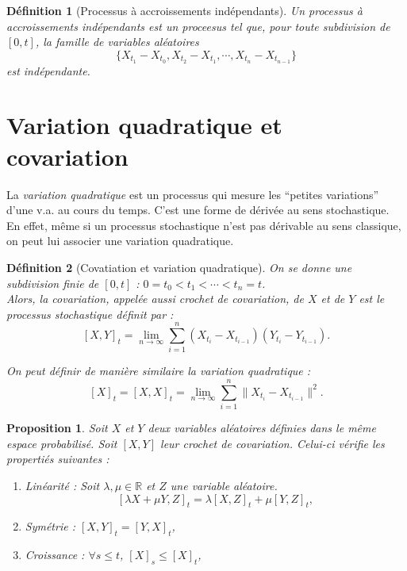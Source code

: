 \documentclass[openany]{book}
\newcommand{\R}{\mathbb{R}}
\newcommand{\1}{\mathbbm{1}}
\theoremstyle{thmfont}
\theoremstyle{deffont}
\newtheorem{definition}[definition]{Définition}
\theoremstyle{thmfont}
\newtheorem{prop}[prop]{Proposition}
\theoremstyle{deffont}
\begin{document}
\begin{definition}[Processus à accroissements indépendants]
  \label{def:pr_accr_indep} Un processus à \textit{accroissements indépendants} est un proceesus tel que, pour toute subdivision de $[0,t]$, la famille de variables aléatoires
    $$\{X_{t_1} - X_{t_0}, X_{t_2} - X_{t_1}, \cdots ,X_{t_n} - X_{t_{n-1}}\}$$
    est indépendante.
\end{definition}

%
%    

\section{Variation quadratique et covariation}

La \textit{variation quadratique} est un processus qui mesure les ``petites variations'' d'une v.a. au cours du temps. C'est une forme de dérivée au sens stochastique. En effet, même si un processus stochastique n'est pas dérivable au sens classique, on peut lui associer une variation quadratique. 

\begin{definition}[Covatiation et variation quadratique] On se donne une subdivision finie de $[0,t]$ :  $0 = t_0 < t_1 < \cdots < t_n = t$.\\
  Alors, la \textit{covariation}, appelée aussi \textit{crochet de covariation}, de $X$ et de $Y$ est le processus stochastique définit par :
  $$[X,Y]_t = \lim_{n\to \infty} \sum_{i = 1}^n(X_{t_i} - X_{t_{i-1}})(Y_{t_i} - Y_{t_{i-1}}).$$

 On peut définir de manière similaire la \textit{variation quadratique} :
 $$[X]_t = [X,X]_t = \lim_{n\to \infty} \sum_{i = 1}^n\|X_{t_i} - X_{t_{i-1}}\|^2.$$
\label{def:crochet}
\end{definition}

\begin{prop} Soit $X$ et $Y$ deux variables aléatoires définies dans le même espace probabilisé. Soit $[X,Y]$ leur crochet de covariation. Celui-ci vérifie les propertiés suivantes : 
  \begin{enumerate}
  \item Linéarité : Soit $\lambda, \mu \in \R$ et $Z$ une variable aléatoire. $$[\lambda X + \mu Y, Z]_t = \lambda[X,Z]_t + \mu[Y,Z]_t,$$
  \item Symétrie : $[X,Y]_t = [Y,X]_t$,
  \item Croissance : $\forall s\leq t$, $[X]_s \leq [X]_t$,
  \end{enumerate}
\end{prop}
\end{document}
